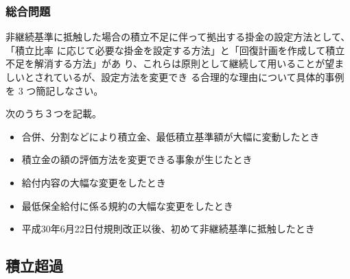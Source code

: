 \newpage

\subsubsection{総合問題}

\begin{shortanswer}[年金2 2020 問題2(1)]
  非継続基準に抵触した場合の積立不足に伴って拠出する掛金の設定方法として、「積立比率
  に応じて必要な掛金を設定する方法」と「回復計画を作成して積立不足を解消する方法」があ
  り、これらは原則として継続して用いることが望ましいとされているが、設定方法を変更でき
  る合理的な理由について具体的事例を 3 つ簡記しなさい。
\end{shortanswer}

\begin{answerbox}
  次のうち３つを記載。
  \begin{itemize}
    \item 合併、分割などにより積立金、最低積立基準額が大幅に変動したとき
    \item 積立金の額の評価方法を変更できる事象が生じたとき
    \item 給付内容の大幅な変更をしたとき
    \item 最低保全給付に係る規約の大幅な変更をしたとき
    \item 平成30年6月22日付規則改正以後、初めて非継続基準に抵触したとき
  \end{itemize}
\end{answerbox}

\newpage

\subsection{積立超過}

